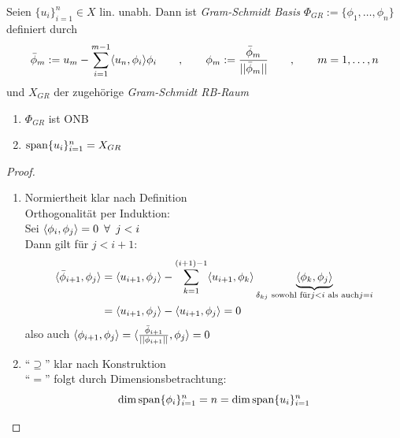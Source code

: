\begin{defn}
	Seien $\{u_i\}_{i=1}^n \in X$ lin. unabh. Dann ist \emph{Gram-Schmidt Basis} $\Phi_{GR} := \{\phi_1,\dots, \phi_n\}$ definiert durch
\[
	\bar{\phi}_m := u_m - \sum\limits_{i=1}^{m-1} \dotp{u_n}{\phi_i}\phi_i \qquad, \qquad \phi_m := \frac{\bar{\phi}_m}{||\bar{\phi}_m||} \qquad, \qquad m=1,\dots,n	
\]
und $X_{GR}$ der zugehörige \emph{Gram-Schmidt RB-Raum}
\end{defn}

\begin{lemma} \beginwithlist
\begin{enumerate}
	\item $\Phi_{GR}$ ist ONB
	\item $\operatorname{span}\{u_i\}_{i=1}^n = X_{GR}$
\end{enumerate}
\begin{proof}
	\begin{enumerate}
		\item Normiertheit klar nach Definition \\
		Orthogonalität per Induktion: \\
		Sei $\dotp{\phi_i}{\phi_j} = 0 \,\,\, \forall \,\,\, j < i$ \\
		Dann gilt für $j < i+1$:
		\begin{align*}
			\dotp{\bar{\phi}_{i+1}}{\phi_j} &= \dotp{u_{i+1}}{\phi_j} - \sum\limits_{k=1}^{(i+1) -1} \dotp{u_{i+1}}{\phi_k} \underbrace{\dotp{\phi_k}{\phi_j}}_{\delta_{kj} \text{ sowohl für} j<i \text{ als auch} j=i}	 \\
			&= \dotp{u_{i+1}}{\phi_j} - \dotp{u_{i+1}}{\phi_j}= 0
		\end{align*}
		also auch $\dotp{\phi_{i+1}}{\phi_j} = \dotp{\frac{\bar{\phi}_{i+1}}{||\phi_{i+1} ||}}{\phi_j} = 0$
		\item ``$\supseteq$'' klar nach Konstruktion \\
		``$=$'' folgt durch Dimensionsbetrachtung:
		\[
			\dim \op{span} \{\phi_i\}_{i=1}^n = n = \dim \op{span} \{u_i\}_{i=1}^n
		\]
	\end{enumerate}
\end{proof}
\end{lemma}


